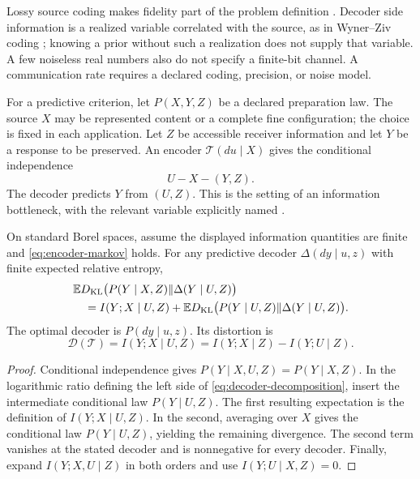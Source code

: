 Lossy source coding makes fidelity part of the problem definition \citep{Shannon1959}. Decoder side information is a realized variable correlated with the source, as in Wyner--Ziv coding \citep{WynerZiv1976}; knowing a prior without such a realization does not supply that variable. A few noiseless real numbers also do not specify a finite-bit channel. A communication rate requires a declared coding, precision, or noise model.

For a predictive criterion, let $P(X,Y,Z)$ be a declared preparation law. The source $X$ may be represented content or a complete fine configuration; the choice is fixed in each application. Let $Z$ be accessible receiver information and let $Y$ be a response to be preserved. An encoder $\mathcal T(du\mid X)$ gives the conditional independence
\begin{equation}
U-X-(Y,Z).
\label{eq:encoder-markov}
\end{equation}
The decoder predicts $Y$ from $(U,Z)$. This is the setting of an information bottleneck, with the relevant variable explicitly named \citep{Tishby1999}.

On standard Borel spaces, assume the displayed information quantities are finite and \cref{eq:encoder-markov} holds. For any predictive decoder $\Delta(dy\mid u,z)$ with finite expected relative entropy,
\begin{equation}
\begin{aligned}
&\mathbb ED_{\mathrm{KL}}\bigl(P(Y\mid X,Z)\Vert\Delta(Y\mid U,Z)\bigr)\\
&\quad=I(Y;X\mid U,Z)
+\mathbb ED_{\mathrm{KL}}\bigl(P(Y\mid U,Z)\Vert\Delta(Y\mid U,Z)\bigr).
\end{aligned}
\label{eq:decoder-decomposition}
\end{equation}
The optimal decoder is $P(dy\mid u,z)$. Its distortion is
\begin{equation}
\mathcal D(\mathcal T)=I(Y;X\mid U,Z)
=I(Y;X\mid Z)-I(Y;U\mid Z).
\label{eq:predictive-distortion}
\end{equation}
\begin{proof}
Conditional independence gives $P(Y\mid X,U,Z)=P(Y\mid X,Z)$. In the logarithmic ratio defining the left side of \cref{eq:decoder-decomposition}, insert the intermediate conditional law $P(Y\mid U,Z)$. The first resulting expectation is the definition of $I(Y;X\mid U,Z)$. In the second, averaging over $X$ gives the conditional law $P(Y\mid U,Z)$, yielding the remaining divergence. The second term vanishes at the stated decoder and is nonnegative for every decoder. Finally, expand $I(Y;X,U\mid Z)$ in both orders and use $I(Y;U\mid X,Z)=0$.
\end{proof}


